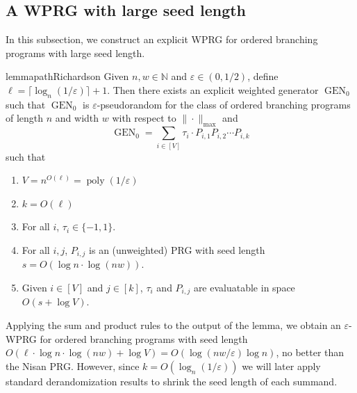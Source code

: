 \documentclass[11pt]{article}
\numberwithin{equation}{section}
\theoremstyle{definition}
\theoremstyle{plain}
\newcommand{\N}{\mathbb N}
\newcommand{\eps}{\varepsilon}
\newcommand{\poly}{\operatorname{poly}}
\DeclareMathOperator{\gen}{GEN}
\begin{document}
\subsection{A WPRG with large seed length}
In this subsection, we construct an explicit WPRG for ordered branching programs with large seed length.
\begin{restatable}{lemma}{pathRichardson}\label{lem:pathRichardson}
Given $n,w \in \N$ and $\eps \in (0,1/2)$, define $\ell=\lceil \log_{n}(1/\eps)\rceil+1$. Then there exists an explicit weighted generator $\gen_0$ such that $\gen_0$ is $\eps$-pseudorandom for the class of ordered branching programs of length $n$ and width $w$ with respect to $\|\cdot\|_{\max}$ and
\[\gen_0 = \sum_{i\in [V]}\tau_i\cdot P_{i,1}P_{i,2}\cdots P_{i,k}\]
such that %
\begin{enumerate}
    \item $V=n^{O(\ell)}=\poly(1/\eps)$
    \item $k=O(\ell)$
    \item For all $i$, $\tau_i\in \{-1,1\}$.
    \item For all $i,j$, $P_{i,j}$ is an (unweighted) PRG with seed length $s=O(\log n \cdot\log(nw))$.
    \item Given $i\in [V]$ and $j\in [k]$, $\tau_i$ and $P_{i,j}$ are evaluatable in space $O(s+\log V)$.
\end{enumerate}
\end{restatable}
Applying the sum and product rules to the output of the lemma, we obtain an $\eps$-WPRG for ordered branching programs with seed length $O(\ell\cdot \log n\cdot\log(nw)+\log V)=O(\log(nw/\eps)\log n)$, no better than the Nisan PRG. However, since $k=O(\log_{n}(1/\eps))$ we will later apply standard derandomization results to shrink the seed length of each summand.
\end{document}
